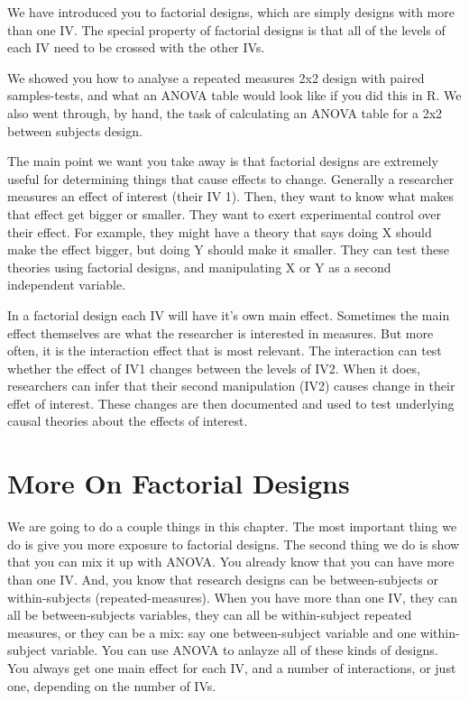 \documentclass[
]{book}
\begin{document}
We have introduced you to factorial designs, which are simply designs with more than one IV. The special property of factorial designs is that all of the levels of each IV need to be crossed with the other IVs.

We showed you how to analyse a repeated measures 2x2 design with paired samples-tests, and what an ANOVA table would look like if you did this in R. We also went through, by hand, the task of calculating an ANOVA table for a 2x2 between subjects design.

The main point we want you take away is that factorial designs are extremely useful for determining things that cause effects to change. Generally a researcher measures an effect of interest (their IV 1). Then, they want to know what makes that effect get bigger or smaller. They want to exert experimental control over their effect. For example, they might have a theory that says doing X should make the effect bigger, but doing Y should make it smaller. They can test these theories using factorial designs, and manipulating X or Y as a second independent variable.

In a factorial design each IV will have it's own main effect. Sometimes the main effect themselves are what the researcher is interested in measures. But more often, it is the interaction effect that is most relevant. The interaction can test whether the effect of IV1 changes between the levels of IV2. When it does, researchers can infer that their second manipulation (IV2) causes change in their effet of interest. These changes are then documented and used to test underlying causal theories about the effects of interest.

\hypertarget{more-on-factorial-designs}{%
\chapter{More On Factorial Designs}\label{more-on-factorial-designs}}

We are going to do a couple things in this chapter. The most important thing we do is give you more exposure to factorial designs. The second thing we do is show that you can mix it up with ANOVA. You already know that you can have more than one IV. And, you know that research designs can be between-subjects or within-subjects (repeated-measures). When you have more than one IV, they can all be between-subjects variables, they can all be within-subject repeated measures, or they can be a mix: say one between-subject variable and one within-subject variable. You can use ANOVA to anlayze all of these kinds of designs. You always get one main effect for each IV, and a number of interactions, or just one, depending on the number of IVs.
\end{document}
